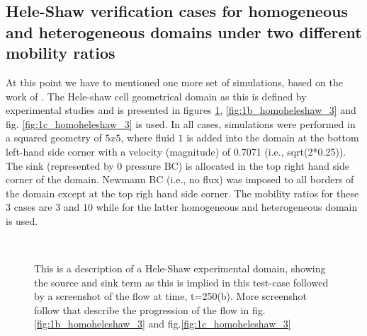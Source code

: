 \documentclass[preprint,authoryear,12pt]{elsarticle}
\begin{document}
\subsection{Hele-Shaw verification cases for homogeneous and heterogeneous domains under two different mobility ratios}

\medskip
At this point we have to mentioned one more set of simulations, based on the work of \citet{saffman_1986}. The Hele-shaw cell geometrical domain as this is defined by experimental studies and is presented in figures \ref{fig:1a_homoheleshaw_3}, \ref{fig:1b_homoheleshaw_3} and fig. \ref{fig:1c_homoheleshaw_3} is used. In all cases, simulations were performed in a squared geometry of $5x5$, where fluid $1$ is added into the domain at the bottom left-hand side corner with a velocity (magnitude) of 0.7071 (i.e., sqrt(2*0.25)). The sink (represented by 0 pressure BC) is allocated in the top right hand side corner of the domain. Newmann BC (i.e., no flux) was imposed to all borders of the domain except at the top righ hand side corner. The mobility ratios for these $3$ cases are $3$ and $10$ while for the latter homogeneous and heterogeneous domain is used.  

\begin{figure}
\centering
{}\\[2mm]%
%
\caption{This is a description of a Hele-Shaw experimental domain, showing the source and sink term as this is implied in this test-case followed by a screenshot of the flow at time, t=250(b). More screenshot follow that describe the progression of the flow in fig.\ref{fig:1b_homoheleshaw_3} and fig.\ref{fig:1c_homoheleshaw_3}}
\label{fig:1a_homoheleshaw_3}
\end{figure}
\end{document}
